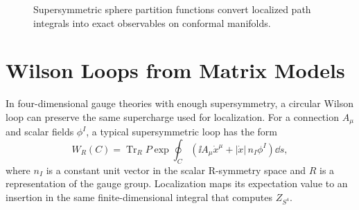 \begin{figure}[H]
  \centering
  \caption{Supersymmetric sphere partition functions convert localized path
  integrals into exact observables on conformal manifolds.}
  \label{fig:sphere-partition-function-cft-data}
\end{figure}

\section{Wilson Loops from Matrix Models}

In four-dimensional gauge theories with enough supersymmetry, a circular
Wilson loop can preserve the same supercharge used for localization.  For a
connection \(A_\mu\) and scalar fields \(\phi^I\), a typical supersymmetric
loop has the form
\[
  W_R(C)
  =
  \operatorname{Tr}_R
  P\exp\oint_C
  \left(
    \ii A_\mu\dot x^\mu
    +
    |\dot x|\,n_I\phi^I
  \right)\dd s,
\]
where \(n_I\) is a constant unit vector in the scalar R-symmetry space and
\(R\) is a representation of the gauge group.  Localization maps its
expectation value to an insertion in the same finite-dimensional integral
that computes \(Z_{S^4}\).


